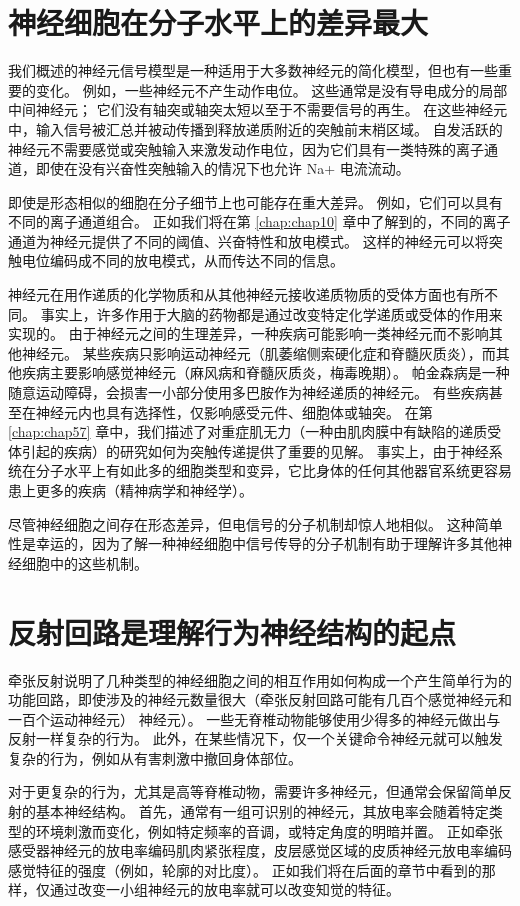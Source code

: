 \section{神经细胞在分子水平上的差异最大}
我们概述的神经元信号模型是一种适用于大多数神经元的简化模型，但也有一些重要的变化。 
例如，一些神经元不产生动作电位。 
这些通常是没有导电成分的局部中间神经元； 它们没有轴突或轴突太短以至于不需要信号的再生。 
在这些神经元中，输入信号被汇总并被动传播到释放递质附近的突触前末梢区域。 
自发活跃的神经元不需要感觉或突触输入来激发动作电位，因为它们具有一类特殊的离子通道，即使在没有兴奋性突触输入的情况下也允许 Na+ 电流流动。


即使是形态相似的细胞在分子细节上也可能存在重大差异。 
例如，它们可以具有不同的离子通道组合。 
正如我们将在第 \ref{chap:chap10} 章中了解到的，不同的离子通道为神经元提供了不同的阈值、兴奋特性和放电模式。 
这样的神经元可以将突触电位编码成不同的放电模式，从而传达不同的信息。


神经元在用作递质的化学物质和从其他神经元接收递质物质的受体方面也有所不同。 
事实上，许多作用于大脑的药物都是通过改变特定化学递质或受体的作用来实现的。 
由于神经元之间的生理差异，一种疾病可能影响一类神经元而不影响其他神经元。 
某些疾病只影响运动神经元（肌萎缩侧索硬化症和脊髓灰质炎），而其他疾病主要影响感觉神经元（麻风病和脊髓灰质炎，梅毒晚期）。 
帕金森病是一种随意运动障碍，会损害一小部分使用多巴胺作为神经递质的神经元。 
有些疾病甚至在神经元内也具有选择性，仅影响感受元件、细胞体或轴突。 
在第 \ref{chap:chap57} 章中，我们描述了对重症肌无力（一种由肌肉膜中有缺陷的递质受体引起的疾病）的研究如何为突触传递提供了重要的见解。 
事实上，由于神经系统在分子水平上有如此多的细胞类型和变异，它比身体的任何其他器官系统更容易患上更多的疾病（精神病学和神经学）。


尽管神经细胞之间存在形态差异，但电信号的分子机制却惊人地相似。 
这种简单性是幸运的，因为了解一种神经细胞中信号传导的分子机制有助于理解许多其他神经细胞中的这些机制。


\section{反射回路是理解行为神经结构的起点}
牵张反射说明了几种类型的神经细胞之间的相互作用如何构成一个产生简单行为的功能回路，即使涉及的神经元数量很大（牵张反射回路可能有几百个感觉神经元和一百个运动神经元） 神经元）。 
一些无脊椎动物能够使用少得多的神经元做出与反射一样复杂的行为。 
此外，在某些情况下，仅一个关键命令神经元就可以触发复杂的行为，例如从有害刺激中撤回身体部位。


对于更复杂的行为，尤其是高等脊椎动物，需要许多神经元，但通常会保留简单反射的基本神经结构。 
首先，通常有一组可识别的神经元，其放电率会随着特定类型的环境刺激而变化，例如特定频率的音调，或特定角度的明暗并置。 
正如牵张感受器神经元的放电率编码肌肉紧张程度，皮层感觉区域的皮质神经元放电率编码感觉特征的强度（例如，轮廓的对比度）。 
正如我们将在后面的章节中看到的那样，仅通过改变一小组神经元的放电率就可以改变知觉的特征。


